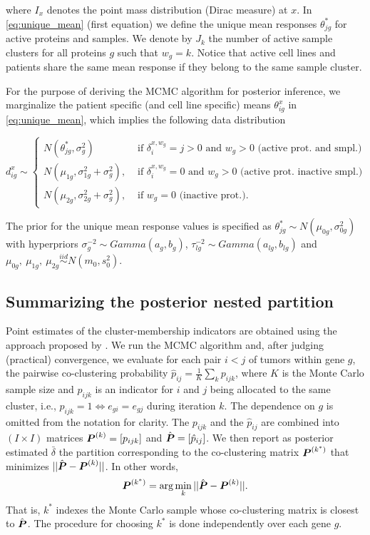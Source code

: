 \noindent where $I_{x}$ denotes the point mass distribution (Dirac measure) at $x$. In \eqref{eq:unique_mean} (first equation) we define the unique mean responses $\theta^*_{jg}$ for active proteins and samples. We denote by $J_k$ the number of active sample clusters for all proteins $g$ such that $w_g=k$. Notice that active cell lines and patients share the same mean response if they belong to the same sample cluster. 

For the purpose of deriving the MCMC algorithm for posterior inference, we marginalize the patient specific (and cell line specific) means $\theta^x_{ig}$ in \eqref{eq:unique_mean}, which implies the following data distribution

\begin{equation}
d^x_{ig} \sim
\begin{cases}
N(\theta^*_{jg}, \sigma^2_g) \ &\mbox{ if  } \delta^{x, w_g}_i = j > 0 \mbox{ and } w_g > 0 \mbox{ (active prot. and smpl.)}\\
N(\mu_{1g}, \sigma^2_{1g} + \sigma^2_g), &\mbox{ if  } \delta^{x,w_g}_i = 0 \mbox{ and }w_g>0 \mbox{ (active prot. inactive smpl.)} \\
N(\mu_{2g}, \sigma^2_{2g} + \sigma^2_g), &\mbox{ if  } w_g=0 \mbox{ (inactive prot.)}.
\end{cases}
\label{eq:unique_mean_2}
\end{equation}

The prior for the unique mean response values is specified as $\theta^*_{jg} \sim N(\mu_{0g}, \sigma^2_{0g})$ with hyperpriors $\sigma^{-2}_{g} \sim Gamma(a_g, b_g)$, $\tau^{-2}_{lg} \sim Gamma(a_{lg}, b_{lg})$ and $\mu_{0g}, \ \mu_{1g}, \ \mu_{2g} \stackrel{iid}{\sim} N(m_0, s^2_0)$.

\subsection{Summarizing the posterior nested partition}
\label{sec:dahl_veera}

Point estimates of the cluster-membership indicators are obtained using the
approach proposed by \cite{dahl2006}. We run the MCMC algorithm and, after
judging (practical) convergence, we evaluate for each pair $i<j$ of
tumors within gene $g$, the pairwise co-clustering probability $\hat{p}_{ij} = \frac{1}{K}\sum_k p_{ijk}$, where $K$ is the Monte Carlo sample size and $p_{ijk}$ is
an indicator for $i$ and $j$ being allocated to the same cluster, i.e., $p_{ijk} = 1 \Leftrightarrow e_{gi} = e_{gj}$ during iteration $k$. The dependence on $g$ is omitted from the notation for clarity. The
$p_{ijk}$ and the $\hat{p}_{ij}$ are combined into $(I \times I)$ matrices
$\mbox{\boldmath $P$}^{(k)} = [p_{ijk}]$ and $\hat{\mbox{\boldmath $P$}} = [\hat{p}_{ij}]$. We then report as
posterior estimated $\bar{\delta}$ the partition corresponding to the
co-clustering matrix $\mbox{\boldmath $P$}^{(k^*)}$ that minimizes $ || \hat{\mbox{\boldmath $P$}}- \mbox{\boldmath $P$}^{(k)} ||$. In other words,
$$
  \mbox{\boldmath $P$}^{(k^*)} = \arg\min_k || \hat{\mbox{\boldmath $P$}} - \mbox{\boldmath $P$}^{(k)} ||.
$$
That is, $k^*$ indexes the Monte Carlo sample whose co-clustering
matrix is closest to $\hat{\mbox{\boldmath $P$}}$. The procedure for choosing $k^*$ is done independently over each gene $g$.


